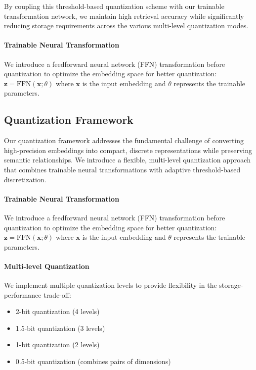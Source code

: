 By coupling this threshold-based quantization scheme with our trainable transformation network, we maintain high retrieval accuracy while significantly reducing storage requirements across the various multi-level quantization modes.

\paragraph{Trainable Neural Transformation}
We introduce a feedforward neural network (FFN) transformation before quantization to optimize the embedding space for better quantization: $\mathbf{z} = \text{FFN}(\mathbf{x}; \theta)$ where $\mathbf{x}$ is the input embedding and $\theta$ represents the trainable parameters.


\subsection{Quantization Framework}
\label{subsec:quantization_framework}

Our quantization framework addresses the fundamental challenge of converting high-precision embeddings into compact, discrete representations while preserving semantic relationships. We introduce a flexible, multi-level quantization approach that combines trainable neural transformations with adaptive threshold-based discretization.

\paragraph{Trainable Neural Transformation}
We introduce a feedforward neural network (FFN) transformation before quantization to optimize the embedding space for better quantization: $\mathbf{z} = \text{FFN}(\mathbf{x}; \theta)$ where $\mathbf{x}$ is the input embedding and $\theta$ represents the trainable parameters.

\paragraph{Multi-level Quantization}
We implement multiple quantization levels to provide flexibility in the storage-performance trade-off:
\begin{itemize}
    \item 2-bit quantization (4 levels)
    \item 1.5-bit quantization (3 levels)
    \item 1-bit quantization (2 levels)
    \item 0.5-bit quantization (combines pairs of dimensions)
\end{itemize}

